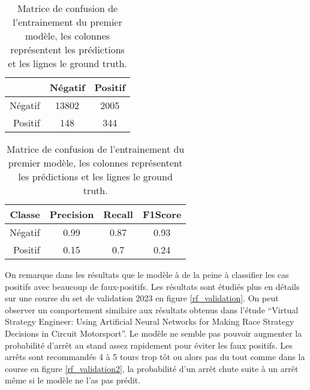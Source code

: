 \begin{table}[H]
    \begin{center}
        \caption{\label{rf_matrix}Matrice de confusion de l'entrainement du premier modèle, les colonnes représentent les prédictions et les lignes le ground truth.}
        \begin{tabular}{r|cc}
                    & Négatif & Positif \\ \hline
            Négatif & 13802   & 2005    \\
            Positif & 148     & 344     \\
        \end{tabular}
    \end{center}
\end{table}

\begin{table}[H]
    \begin{center}
        \caption{\label{rf_results}Matrice de confusion de l'entrainement du premier modèle, les colonnes représentent les prédictions et les lignes le ground truth.}
        \begin{tabular}{r|ccc}
            Classe  & Precision & Recall & F1Score \\ \hline
            Négatif & 0.99      & 0.87   & 0.93    \\
            Positif & 0.15      & 0.7    & 0.24    \\
        \end{tabular}
    \end{center}
\end{table}


On remarque dans les résultats que le modèle à de la peine à classifier les cas positifs avec beaucoup de faux-positifs.
Les résultats sont étudiés plus en détails sur une course du set de validation 2023 en figure \ref{rf_validation}.
On peut observer un comportement similaire aux résultats obtenus dans l'étude “Virtual Strategy Engineer: Using Artificial Neural Networks for Making Race Strategy Decisions in Circuit Motorsport”. \cite{app10217805}
Le modèle ne semble pas pouvoir augmenter la probabilité d'arrêt au stand assez rapidement pour éviter les faux positifs.
Les arrêts sont recommandés 4 à 5 tours trop tôt ou alors pas du tout comme dans la course en figure \ref{rf_validation2},
la probabilité d'un arrêt chute suite à un arrêt même si le modèle ne l'as pas prédit.

